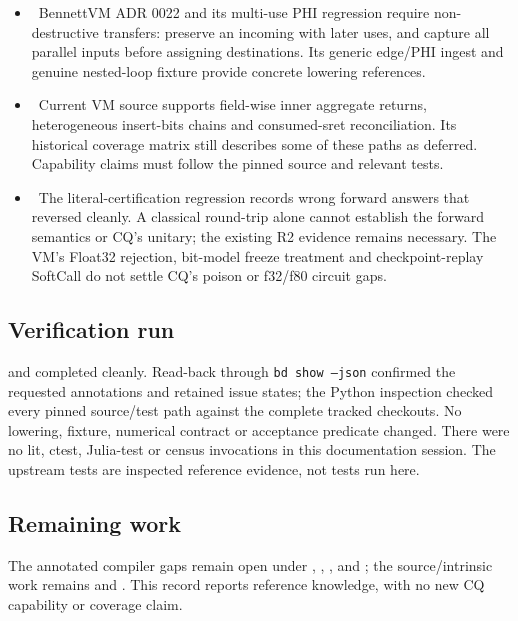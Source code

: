 \begin{itemize}
  \item \fdoc\ BennettVM ADR 0022 and its multi-use PHI regression require
  non-destructive transfers: preserve an incoming with later uses, and capture
  all parallel inputs before assigning destinations. Its generic edge/PHI
  ingest and genuine nested-loop fixture provide concrete lowering references.
  \item \fdoc\ Current VM source supports field-wise inner aggregate returns,
  heterogeneous insert-bits chains and consumed-sret reconciliation. Its
  historical coverage matrix still describes some of these paths as deferred.
  Capability claims must follow the pinned source and relevant tests.
  \item \fdoc\ The literal-certification regression records wrong forward
  answers that reversed cleanly. A classical round-trip alone cannot establish
  the forward semantics or CQ's unitary; the existing R2 evidence remains
  necessary. The VM's Float32 rejection, bit-model freeze treatment and
  checkpoint-replay SoftCall do not settle CQ's poison or f32/f80 circuit gaps.
\end{itemize}

\subsection*{Verification run}
 and
 completed cleanly.
Read-back through \texttt{bd show --json} confirmed the requested annotations
and retained issue states; the Python inspection checked every pinned source/test
path against the complete tracked checkouts. No lowering, fixture, numerical
contract or acceptance predicate changed. There were no lit, ctest, Julia-test
or census invocations in this documentation session. The upstream tests are
inspected reference evidence, not tests run here.

\subsection*{Remaining work}
The annotated compiler gaps remain open under , ,
,  and ; the source/intrinsic work remains
 and . This record reports reference knowledge,
with no new CQ capability or coverage claim.
